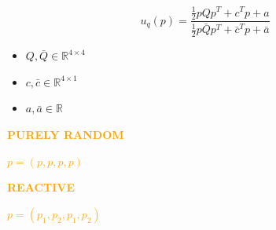 \documentclass{beamer}
\begin{document}
\begin{frame}
    \begin{center}
    \begin{lemma}
     \boldmath\[ u_q(p) = \frac{\frac{1}{2} p Q  p^T + c^T  p + a} 
    {\frac{1}{2} p \bar{Q} p^T + \bar{c}^T p + \bar{a}}\]

    \begin{itemize}
      \item \boldmath\(Q, \bar{Q} \in\mathbb{R}^{4 \times 4}\)
      \item \boldmath\(c, \bar{c}\in\mathbb{R}^{4 \times 1}\) 
      \item \boldmath\(a, \bar{a}\in\mathbb{R}\)  
   \end{itemize}
    \end{lemma}
    \end{center}
\end{frame}

\begin{frame}
    \begin{center}
    
    \end{center}
\end{frame}

\begin{frame}
    \begin{center}
    
    \end{center}
\end{frame}

\begin{frame}
    \begin{center}
    
    \end{center}
\end{frame}

\begin{frame}
    \begin{center}
    \Large{
    \textbf{\textcolor{orange}{PURELY RANDOM}} \vspace{1cm}

    \textcolor{orange}{\boldmath\( p = (p, p, p, p)\)}}
    \end{center}
\end{frame}

\begin{frame}
    \begin{center}
    \Large{
    \textbf{\textcolor{orange}{REACTIVE}} \vspace{1cm}

    \textcolor{orange}{\boldmath\( p = (p_1, p_2, p_1, p_2)\)}}
    \end{center}
\end{frame}
\end{document}
